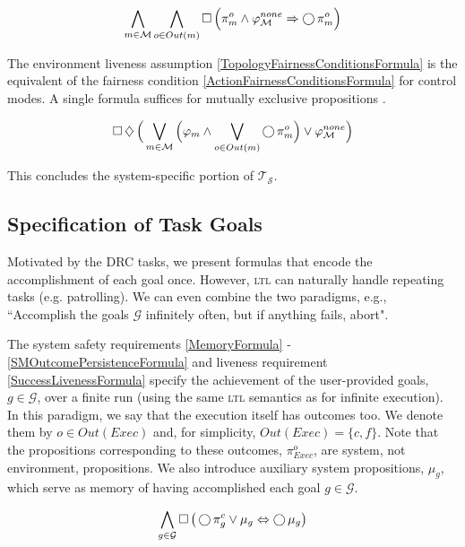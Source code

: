 \begin{equation}\label{TopologyOutcomePersistenceFormula}
	\bigwedge \limits_{m \in \mathcal{M}} \bigwedge \limits_{o \in Out(m)} \operatorname{\Box} \Big( \pi_m^o \wedge \varphi_\mathcal{M}^{none} \Rightarrow \operatorname{\bigcirc} \pi_m^o \Big)
\end{equation}

The environment liveness assumption \eqref{TopologyFairnessConditionsFormula} is the equivalent of the fairness condition \eqref{ActionFairnessConditionsFormula} for control modes.
A single formula suffices for mutually exclusive propositions \cite{Vasu2013ICRA}.

\begin{equation}\label{TopologyFairnessConditionsFormula}
	\operatorname{\Box} \operatorname{\diamondsuit} \Big( \bigvee \limits_{m \in \mathcal{M}} \Big( \varphi_m \wedge \bigvee \limits_{o \in Out(m)} \operatorname{\bigcirc} \pi_m^o \Big) \vee \varphi_\mathcal{M}^{none} \Big)
\end{equation}

This concludes the system-specific portion of $\mathcal{T_S}$.


\subsection{Specification of Task Goals}\label{S:ltl-goals}

Motivated by the DRC tasks, we present formulas that encode the accomplishment of each goal once.
However, \textsc{ltl} can naturally handle repeating tasks (e.g. patrolling).
We can even combine the two paradigms, e.g.,
``Accomplish the goals $\mathcal{G}$ infinitely often, but if anything fails, abort".

The system safety requirements \eqref{MemoryFormula} - \eqref{SMOutcomePersistenceFormula} and liveness requirement \eqref{SuccessLivenessFormula} specify the achievement of the user-provided goals, $g \in \mathcal{G}$, over a finite run (using the same \textsc{ltl} semantics as for infinite execution).
In this paradigm, we say that the execution itself has outcomes too.
We denote them by $o \in Out(Exec)$ and, for simplicity, $Out(Exec) = \{ c, f \}$.
Note that the propositions corresponding to these outcomes, $\pi_{Exec}^o$, are system, not environment, propositions.
We also introduce auxiliary system propositions, $\mu_g$, which serve as memory \cite{Vasu2012IROS} of having accomplished each goal $g \in \mathcal{G}$.

\begin{equation}\label{MemoryFormula}
	\bigwedge \limits_{g \in \mathcal{G}} \operatorname{\Box} \big( \operatorname{\bigcirc} \pi_g^c \vee \mu_g \Leftrightarrow \operatorname{\bigcirc} \mu_g \big)
\end{equation}

